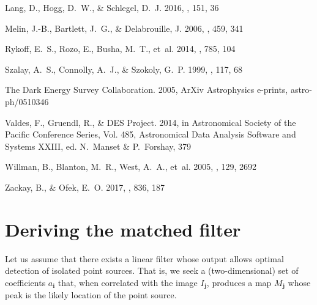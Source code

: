 \documentclass[11pt,letterpaper,linenumbers]{aastex63}
\renewcommand{\vec}[1]{\boldsymbol{#1}}
\newcommand{\ivec}{\vec{i}}
\newcommand{\jvec}{\vec{j}}
\begin{document}
\begin{thebibliography}{}
{Lang}, D., {Hogg}, D.~W., \& {Schlegel}, D.~J. 2016, \aj, 151, 36

{Melin}, J.-B., {Bartlett}, J.~G., \& {Delabrouille}, J. 2006, \aap, 459, 341

{Rykoff}, E.~S., {Rozo}, E., {Busha}, M.~T., {et~al.} 2014, \apj, 785, 104

{Szalay}, A.~S., {Connolly}, A.~J., \& {Szokoly}, G.~P. 1999, \aj, 117, 68

{The Dark Energy Survey Collaboration}. 2005, ArXiv Astrophysics e-prints,
  astro-ph/0510346

{Valdes}, F., {Gruendl}, R., \& {DES Project}. 2014, in Astronomical Society of
  the Pacific Conference Series, Vol. 485, Astronomical Data Analysis Software
  and Systems XXIII, ed. N.~{Manset} \& P.~{Forshay}, 379

{Willman}, B., {Blanton}, M.~R., {West}, A.~A., {et~al.} 2005, \aj, 129, 2692

{Zackay}, B., \& {Ofek}, E.~O. 2017, \apj, 836, 187

\end{thebibliography}

\appendix

\section{Deriving the matched filter}
\label{app:lindet}

Let us assume that there exists a linear filter whose output allows
optimal detection of isolated point sources.  That is, we seek a
(two-dimensional) set of coefficients $a_{\ivec}$ that, when
correlated with the image $I_{\jvec}$, produces a map $M_{\jvec}$
whose peak is the likely location of the point source.
\end{document}
